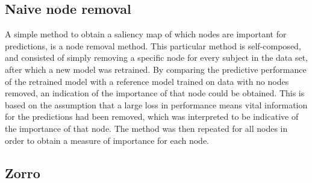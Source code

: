 \subsection{Naive node removal}
A simple method to obtain a saliency map of which nodes are important for predictions, is a node removal method. This particular method is self-composed, and consisted of simply removing a specific node for every subject in the data set, after which a new model was retrained. By comparing the predictive performance of the retrained model with a reference model trained on data with no nodes removed, an indication of the importance of that node could be obtained. This is based on the assumption that a large loss in performance means vital information for the predictions had been removed, which was interpreted to be indicative of the importance of that node. The method was then repeated for all nodes in order to obtain a measure of importance for each node.


\subsection{Zorro}

